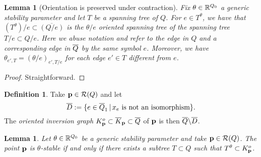 \documentclass{amsart}
\newtheorem{lem}[thm]{Lemma}
\theoremstyle{definition}
\newtheorem{defn}[thm]{Definition}
\begin{document}
\begin{lem}[Orientation is preserved under contraction]
Fix $\theta \in \mathbb{R}^{Q_0}$ a generic stability parameter and let $T$ be a spanning tree of $Q$.
For $e \in T^\theta$, we have that $(T^\theta)/e \subset \overline{(Q/e)}$ is the $\theta/e$ oriented spanning tree of the spanning tree $T/e \subset Q/e$.
Here we abuse notation and refer to the edge in $Q$ and a corresponding edge in ${\overline{Q}}$ by the same symbol $e$. Moreover, we have $\theta_{e',T}=(\theta/e)_{e',T/e}$ for each edge $e'\in T$ different from $e$.
\end{lem}

\begin{proof}
Straightforward.
\end{proof}

\begin{defn}
Take $\mathbf{p} \in \mathcal{R}(Q)$ and let $${\overline{D}} :=\{e\in {\overline{Q}}_1 \,|\, x_e \text{ is not an isomorphism}\}.$$   
The {\em oriented inversion graph} $K_{\mathbf{p}}^o \subset {\overline{K}}_{\mathbf{p}} \subset {\overline{Q}}$ of $\mathbf{p}$ is then ${\overline{Q}} \backslash {\overline{D}}$.
\end{defn}


\begin{lem}\label{lm:orientedtree}
Let $\theta \in \mathbb{R}^{Q_0}$ be a generic stability parameter and take $\mathbf{p} \in \mathcal{R}(Q)$. 
The point $\mathbf{p}$ is $\theta$-stable if and only if there exists a subtree $T\subset Q$ such that $T^\theta \subset K_{\mathbf{p}}^o$.
\end{lem}
\end{document}
